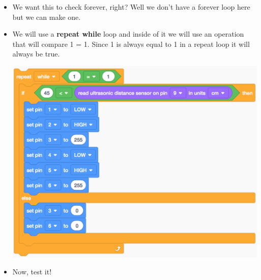 \documentclass[12pt]{article}
\begin{document}
\begin{itemize}
\begin{center}
		\end{center}
		\item We want this to check forever, right?  Well we don't have a forever loop here but we can make one.
		\item We will use a \textbf{repeat while} loop and inside of it we will use an operation that will compare 1 = 1.  Since 1 is always equal to 1 in a repeat loop it will always be true.
		\begin{center}
			\includegraphics[scale = 0.6]{./Images/code5}
		\end{center}
		\item Now, test it!
	\end{itemize}
	
\end{document}
